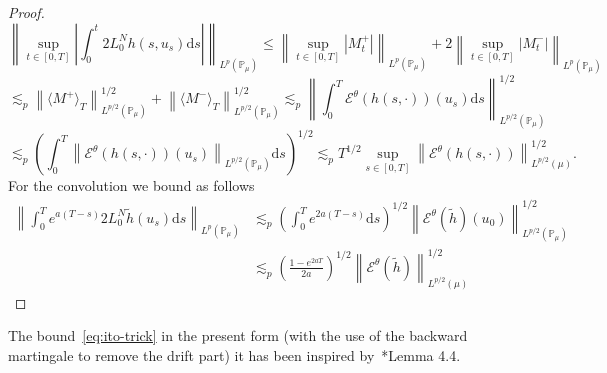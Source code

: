 \documentclass[11pt,a4paper,draft,reqno]{amsart}
\newcommand{\PP}{\mathbb{P}}
\newcommand{\cE}{\mathcal{E}}
\newcommand{\dd}{\mathrm{d}}
\begin{document}
\begin{proof}
$$
\left\|\sup_{t\in[0,T]}\left|\int_0^t  2 L_0^N h(s,u_s) \dd s\right|\right\|_{L^p(\PP_\mu)} \le
\left\|\sup_{t\in[0,T]}|M^+_t| \right\|_{L^p(\PP_\mu)}+
2 \left\|\sup_{t\in[0,T]}|M^-_t| \right\|_{L^p(\PP_\mu)}
$$
$$
\lesssim_p \left\| \langle M^+\rangle_T  \right\|_{L^{p/2}(\PP_\mu)}^{1/2}+\left\| \langle M^-\rangle_T  \right\|_{L^{p/2}(\PP_\mu)}^{1/2}
\lesssim_p \left\|\int_0^T \cE^\theta(h(s,\cdot))(u_s) \dd s \right\|_{L^{p/2}(\PP_\mu)}^{1/2}
$$
$$
\lesssim_p \left(\int_0^T\left\| \cE^\theta(h(s,\cdot))(u_s) \right\|_{L^{p/2}(\PP_\mu)} \dd s\right)^{1/2}
\lesssim_p T^{1/2} \sup_{s\in[0,T]} \left\| \cE^\theta(h(s,\cdot)) \right\|_{L^{p/2}(\mu)}^{1/2} .
$$
For the convolution we bound as follows
\begin{equation*}
\begin{split}
\left\|\int_0^T e^{a(T-s)} 2 L_0^N \tilde h(u_s) \dd s\right\|_{L^p(\PP_\mu)} 
&  \lesssim_p \left(\int_0^T e^{2a(T-s)}\dd s\right)^{1/2} 
 \left\| \cE^\theta(\tilde h)(u_0) \right\|^{1/2}_{L^{p/2}(\PP_\mu)} 
 \\ &  \lesssim_p
 \left(\frac{1-e^{2aT}}{2a}\right)^{1/2} 
 \left\| \cE^\theta(\tilde h) \right\|^{1/2}_{L^{p/2}(\mu)}
 \end{split}
\end{equation*}
\end{proof}
The bound~\eqref{eq:ito-trick} in the present form (with the use of the backward martingale to remove the drift part) it has been inspired by~\cite{CLO}*{Lemma 4.4}.
\end{document}
